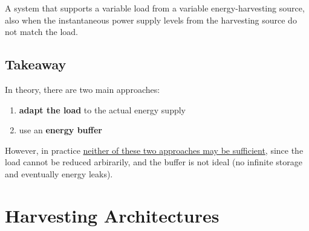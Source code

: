 \begin{definition}
      A system that supports a variable load from a variable energy-harvesting source, also when the instantaneous power supply levels from the harvesting source do not match the load.
\end{definition}

\subsection{Takeaway}
In theory, there are two main approaches:
{\ns\begin{enumerate}
   \item \textbf{adapt the load} to the actual energy supply
   \item use an \textbf{energy buffer}
\end{enumerate}}

However, in practice \ul{neither of these two approaches may be sufficient}, since the load cannot be reduced arbirarily, and the buffer is not ideal (no infinite storage and eventually energy leaks).
\newpage
\section{Harvesting Architectures}
